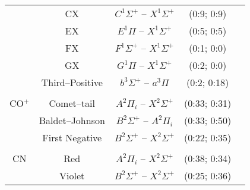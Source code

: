 \begin{center}
\begin{footnotesize}
\begin{supertabular*}{1.0\textwidth}{ccccc}
                                                & CX                                               & $C^1 \Sigma^+$ -- $X^1 \Sigma^+$                            & (0:9; 0:9)                                 & \cite{hyun_phd} \\
                                                & EX                                               & $E^1 \Pi$ -- $X^1 \Sigma^+$                                         & (0:5; 0:5)                                 & \cite{hyun_phd} \\
                                                & FX                                               & $F^1 \Sigma^+$ -- $X^1 \Sigma^+$                             & (0:1; 0:0)                                 & \cite{hyun_phd} \\
                                                & GX                                               & $G^1 \Pi$ -- $X^1 \Sigma^+$                                        & (0:2; 0:0)                                 & \cite{hyun_phd} \\
                                                & Third--Positive                          & $b^3 \Sigma^+$ -- $a^3 \Pi$                                         & (0:2; 0:18)                               & \cite{BRP+2009} \\
\\
                           CO$^+$      & Comet--tail                                & $A^2 \Pi_i$ -- $X^2 \Sigma^+$                                      & (0:33; 0:31)                               & \cite{BRP+2009} \\
                                                & Baldet--Johnson                      & $B^2 \Sigma^+$ -- $A^2 \Pi_i$                                      & (0:33; 0:50)                               & \cite{BRP+2009} \\
                                                & First Negative                           & $B^2 \Sigma^+$ -- $X^2 \Sigma^+$                             & (0:22; 0:35)                               & \cite{BRP+2009} \\
\\
                           CN               & Red                                            & $A^2 \Pi_i$ -- $X^2 \Sigma^+$                                      & (0:38; 0:34)                               & \cite{BRP+2009} \\
                                                & Violet                                         & $B^2 \Sigma^+$ -- $X^2 \Sigma^+$                             & (0:25; 0:36)                               & \cite{BRP+2009} \\

\end{supertabular*}
\end{footnotesize}
\end{center}
